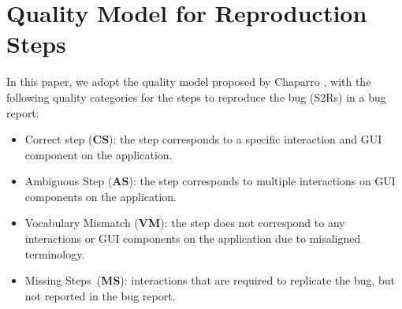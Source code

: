 
\section{Quality Model for Reproduction Steps}
\label{sec:quality_model}

In this paper, we adopt the quality model proposed by Chaparro \etal \cite{Chaparro2019}, with the following quality categories for the steps to reproduce the bug (S2Rs) in a bug report: 
\begin{itemize}
	\item Correct step (\textbf{CS}): the step corresponds to a specific interaction and GUI component on the application.
	\item Ambiguous Step (\textbf{AS}): the step corresponds to multiple interactions on GUI components on the application.
	\item Vocabulary Mismatch (\textbf{VM}): the step does not correspond to any interactions or GUI components on the application due to misaligned terminology.
	\item Missing Steps~(\textbf{MS}): interactions that are required to replicate the bug, but not reported in the bug report.
\end{itemize}

